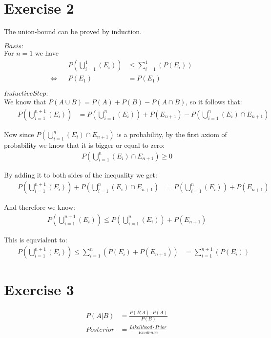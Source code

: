 \section*{Exercise 2}
The union-bound can be proved by induction.

\noindent $Basis:$ \\ For $n=1$ we have
\begin{align}
& & P(\bigcup_{i=1}^{1}(E_i)) & \leq \sum_{i=1}^{1}(P(E_i)) & & \\
\Leftrightarrow & & P(E_1) & = P(E_1) & & 
\end{align}

\noindent $Inductive Step:$ \\
We know that $P(A \cup B) = P(A) + P(B) - P(A \cap B)$, so it follows that:
\begin{align}
& & P(\bigcup_{i=1}^{n+1}(E_i)) & = P(\bigcup_{i=1}^{n}(E_i)) + P(E_{n+1}) - P(\bigcup_{i=1}^{n}(E_i) \cap E_{n+1}) & &
\end{align}

\noindent Now since $P(\bigcup_{i=1}^{n}(E_i) \cap E_{n+1})$ is a probability, by the first axiom of probability we know that it is bigger or equal to zero:
\begin{align}
 P(\bigcup_{i=1}^{n}(E_i) \cap E_{n+1}) \geq 0 
\end{align}

\noindent By adding it to both sides of the inequality we get:
\begin{align}
& & P(\bigcup_{i=1}^{n+1}(E_i)) + P(\bigcup_{i=1}^{n}(E_i) \cap E_{n+1}) & = P(\bigcup_{i=1}^{n}(E_i)) + P(E_{n+1})  & &
\end{align}

\noindent And therefore we know:
\begin{align}
& & P(\bigcup_{i=1}^{n+1}(E_i)) \leq P(\bigcup_{i=1}^{n}(E_i)) + P(E_{n+1})  & &
\end{align}

\noindent This is equvialent to:
\begin{align}
& & P(\bigcup_{i=1}^{n+1}(E_i)) \leq \sum_{i=1}^{n}(P(E_i) + P(E_{n+1})) & = \sum_{i=1}^{n+1}(P(E_i)) & &
\end{align}


\setcounter{equation}{0}
\section*{Exercise 3}

\begin{align}
P(A|B) & = \frac{P(B|A) \cdot P(A)}{P(B)} \\
Posterior & = \frac{Likelihood \cdot Prior}{Evidence}
\end{align}

